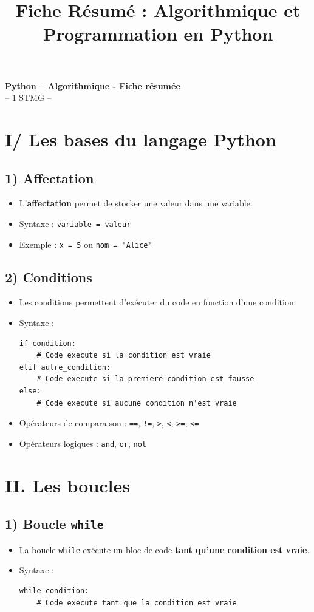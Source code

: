 \documentclass[11pt,a4paper]{article}
\title{Fiche Résumé : Algorithmique et Programmation en Python}
\author{}
\date{}
\begin{document}
\begin{center}
    {\LARGE \textbf{Python -- Algorithmique - Fiche résumée}}\\[4mm]
    {\large -- 1 STMG --}
\end{center}

\vspace{20pt}

\section*{I/ Les bases du langage Python}
\subsection*{1) Affectation}
\begin{itemize}[leftmargin=*]
    \item L'\textbf{affectation} permet de stocker une valeur dans une variable.
    \item Syntaxe : \lstinline|variable = valeur|
    \item Exemple : \lstinline|x = 5| ou \lstinline|nom = "Alice"|
\end{itemize}

\subsection*{2) Conditions}
\begin{itemize}[leftmargin=*]
    \item Les conditions permettent d'exécuter du code en fonction d'une condition.
    \item Syntaxe :
    \begin{lstlisting}
if condition:
    # Code execute si la condition est vraie
elif autre_condition:
    # Code execute si la premiere condition est fausse
else:
    # Code execute si aucune condition n'est vraie
    \end{lstlisting}
    \item Opérateurs de comparaison : \lstinline|==|, \lstinline|!=|, \lstinline|>|, \lstinline|<|, \lstinline|>=|, \lstinline|<=|
    \item Opérateurs logiques : \lstinline|and|, \lstinline|or|, \lstinline|not|
\end{itemize}

\section*{II. Les boucles}
\subsection*{1) Boucle \texttt{while}}
\begin{itemize}[leftmargin=*]
    \item La boucle \texttt{while} exécute un bloc de code \textbf{tant qu'une condition est vraie}.
    \item Syntaxe :
    \begin{lstlisting}
while condition:
    # Code execute tant que la condition est vraie
    \end{lstlisting}
\end{itemize}
\end{document}
